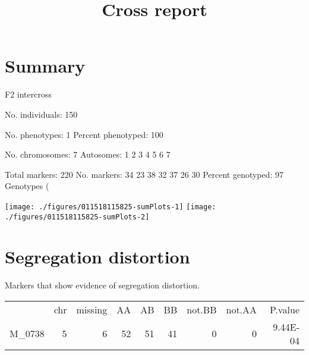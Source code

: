 \documentclass[a4paper,11pt]{article}\usepackage[]{graphicx}\usepackage[]{color}
\title{Cross report}%
\author{\vspace{-5ex}}
\date{\vspace{-5ex}}
\makeatletter
\def\maxwidth{ %
  \ifdim\Gin@nat@width>\linewidth
    \linewidth
  \else
    \Gin@nat@width
  \fi
}
\newenvironment{knitrout}{}{} %
\makeatother
\begin{document}


\maketitle
\singlespacing

\section{Summary}
    F2 intercross

    No. individuals:    150 

    No. phenotypes:     1 
    Percent phenotyped: 100 

    No. chromosomes:    7 
        Autosomes:      1 2 3 4 5 6 7 

    Total markers:      220 
    No. markers:        34 23 38 32 37 26 30 
    Percent genotyped:  97 
    Genotypes (%

\begin{knitrout}
\color{fgcolor}
\texttt{[image: ./figures/011518115825-sumPlots-1]} 
\texttt{[image: ./figures/011518115825-sumPlots-2]} 

\end{knitrout}

\section{Segregation distortion}
Markers that show evidence of segregation distortion.
\begin{table}[ht]
\begin{flushleft}
\begin{tabular}{lrrrrrrrr}
  & chr & missing & AA & AB & BB & not.BB & not.AA & P.value \\ 
 M\_0738 & 5 & 6 & 52 & 51 & 41 & 0 & 0 & 9.44E-04 \\ 
  \end{tabular}
\label{segrDist}
\end{flushleft}
\end{table}
\end{document}
